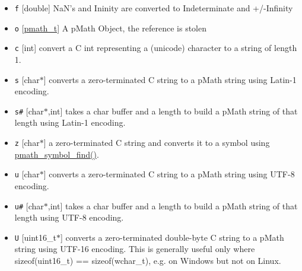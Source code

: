 \begin{itemize}
\item {\tt f} \mbox{[}double\mbox{]} NaN's and Ininity are converted to Indeterminate and +/-Infinity\end{itemize}


\begin{itemize}
\item {\tt o} \mbox{[}\hyperlink{classpmath__t}{pmath\_\-t}\mbox{]} A pMath Object, the reference is stolen\end{itemize}


\begin{itemize}
\item {\tt c} \mbox{[}int\mbox{]} convert a C int representing a (unicode) character to a string of length 1.\end{itemize}


\begin{itemize}
\item {\tt s} \mbox{[}char$\ast$\mbox{]} converts a zero-terminated C string to a pMath string using Latin-1 encoding.\end{itemize}


\begin{itemize}
\item {\tt s\#} \mbox{[}char$\ast$,int\mbox{]} takes a char buffer and a length to build a pMath string of that length using Latin-1 encoding.\end{itemize}


\begin{itemize}
\item {\tt z} \mbox{[}char$\ast$\mbox{]} a zero-terminated C string and converts it to a symbol using \hyperlink{group__symbols_g597a971f788584cac3f327f1afdd5f41}{pmath\_\-symbol\_\-find()}.\end{itemize}


\begin{itemize}
\item {\tt u} \mbox{[}char$\ast$\mbox{]} converts a zero-terminated C string to a pMath string using UTF-8 encoding.\end{itemize}


\begin{itemize}
\item {\tt u\#} \mbox{[}char$\ast$,int\mbox{]} takes a char buffer and a length to build a pMath string of that length using UTF-8 encoding.\end{itemize}


\begin{itemize}
\item {\tt U} \mbox{[}uint16\_\-t$\ast$\mbox{]} converts a zero-terminated double-byte C string to a pMath string using UTF-16 encoding. This is generally useful only where sizeof(uint16\_\-t) == sizeof(wchar\_\-t), e.g. on Windows but not on Linux.\end{itemize}


